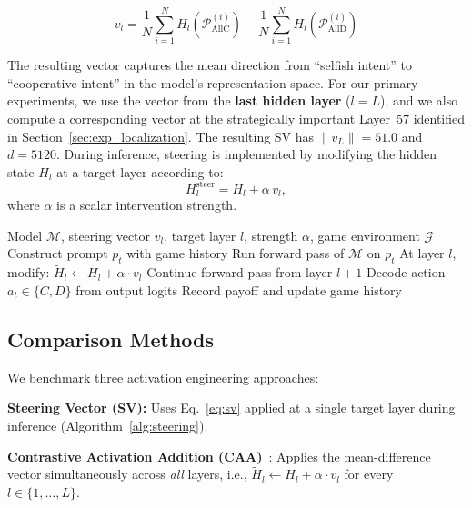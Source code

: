 \documentclass{article}
\begin{document}
\begin{equation}
    v_l = \frac{1}{N} \sum_{i=1}^{N} H_l(\mathcal{P}_{\text{AllC}}^{(i)}) - \frac{1}{N} \sum_{i=1}^{N} H_l(\mathcal{P}_{\text{AllD}}^{(i)})
    \label{eq:sv}
\end{equation}

The resulting vector captures the mean direction from ``selfish intent'' to ``cooperative intent'' in the model's representation space. For our primary experiments, we use the vector from the \textbf{last hidden layer} ($l = L$), and we also compute a corresponding vector at the strategically important Layer~57 identified in Section~\ref{sec:exp_localization}. The resulting SV has $\|v_L\| = 51.0$ and $d = 5120$. During inference, steering is implemented by modifying the hidden state $H_l$ at a target layer according to:
\begin{equation}
    H_l^\text{steer} = H_l + \alpha \, v_l,
    \label{eq:steer}
\end{equation}
where $\alpha$ is a scalar intervention strength.

\begin{algorithm}[t]
\caption{Inference-time Cooperative Steering}
\label{alg:steering}
\begin{algorithmic}[1]
\REQUIRE Model $\mathcal{M}$, steering vector $v_l$, target layer $l$, strength $\alpha$, game environment $\mathcal{G}$
    \STATE Construct prompt $p_t$ with game history
    \STATE Run forward pass of $\mathcal{M}$ on $p_t$
    \STATE At layer $l$, modify: $\tilde{H}_l \leftarrow H_l + \alpha \cdot v_l$
    \STATE Continue forward pass from layer $l+1$
    \STATE Decode action $a_t \in \{C, D\}$ from output logits
    \STATE Record payoff and update game history
\ENDFOR
\end{algorithmic}
\end{algorithm}

\subsection{Comparison Methods}
\label{sec:methods}

We benchmark three activation engineering approaches:

\textbf{Steering Vector (SV):} Uses Eq.~\ref{eq:sv} applied at a single target layer during inference (Algorithm~\ref{alg:steering}).

\textbf{Contrastive Activation Addition (CAA)}~\citep{rimsky2023steering}: Applies the mean-difference vector simultaneously across \textit{all} layers, i.e., $\tilde{H}_l \leftarrow H_l + \alpha \cdot v_l$ for every $l \in \{1, \ldots, L\}$.
\end{document}
